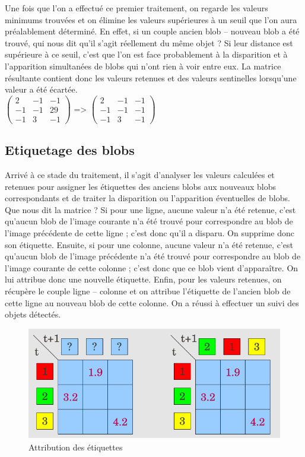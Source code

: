 Une fois que l’on a effectué ce premier traitement, on regarde les valeurs minimums
trouvées et on élimine les valeurs supérieures à un seuil que l’on aura préalablement déterminé. En
effet, si un couple ancien blob – nouveau blob a été trouvé, qui nous dit qu’il s’agit réellement du
même objet ? Si leur distance est supérieure à ce seuil, c’est que l’on est face probablement à la
disparition et à l’apparition simultanées de blobs qui n’ont rien à voir entre eux. La matrice
résultante contient donc les valeurs retenues et des valeurs sentinelles lorsqu’une valeur a été
écartée.\\

$\begin{pmatrix}
   2 & -1 & -1\\
   -1 & -1 & 29\\
   -1 & 3 & -1
\end{pmatrix}$
=>
$\begin{pmatrix}
   2 & -1 & -1\\
   -1 & -1 & -1\\
   -1 & 3 & -1
\end{pmatrix}$\\

\subsection{Etiquetage des blobs}
Arrivé à ce stade du traitement, il s’agit d’analyser les valeurs calculées et retenues pour
assigner les étiquettes des anciens blobs aux nouveaux blobs correspondants et de traiter la
disparition ou l’apparition éventuelles de blobs.\\

Que nous dit la matrice ? Si pour une ligne, aucune valeur n’a été retenue, c’est qu’aucun blob
de l’image courante n’a été trouvé pour correspondre au blob de l’image précédente de cette ligne ;
c’est donc qu’il a disparu. On supprime donc son étiquette. Ensuite, si pour une colonne, aucune
valeur n’a été retenue, c’est qu’aucun blob de l’image précédente n’a été trouvé pour correspondre
au blob de l’image courante de cette colonne ; c’est donc que ce blob vient d’apparaître. On lui
attribue donc une nouvelle étiquette. Enfin, pour les valeurs retenues, on récupère le couple ligne –
colonne et on attribue l’étiquette de l’ancien blob de cette ligne au nouveau blob de cette colonne.
On a réussi à effectuer un suivi des objets détectés.\\

\begin{figure}[H]
      \center
      \includegraphics[width=12cm]{ressources/tp6/matrices.png}
      \caption{Attribution des étiquettes}
\end{figure}

